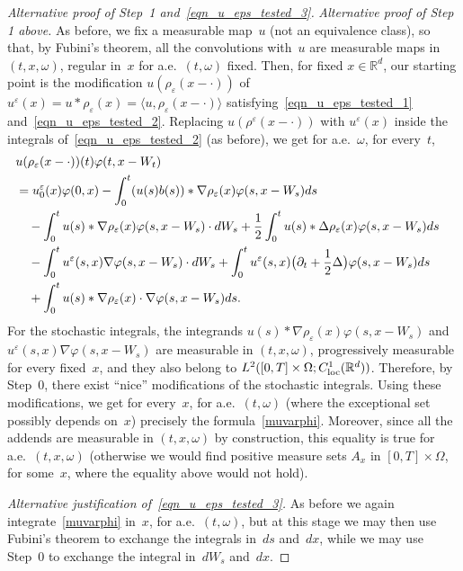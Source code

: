 \documentclass[a4paper,10pt]{article}
\newcommand\1{\mathbbm{1}}
\newcommand{\lan}{\langle}
\newcommand{\ran}{\rangle}
\newcommand{\eps}{\varepsilon}
\newcommand\loc{{\rm loc}}
\numberwithin{equation}{section}
\begin{document}
\begin{proof}[Alternative proof of Step~1 and~\eqref{eqn_u_eps_tested_3}]
\emph{Alternative proof of Step 1 above.} As before, we fix a measurable map~$u$ (not an equivalence class), so that, by Fubini's theorem, all the convolutions with~$u$ are measurable maps in $(t,x,\omega)$, regular in~$x$ for a.e.~$(t,\omega)$ fixed. Then, for fixed $x \in \mathbb{R}^d$, our starting point is the modification $u(\rho_\eps(x-\cdot))$ of $u^\eps(x) = u*\rho_\eps (x) = \lan u, \rho_\eps(x-\cdot) \ran$ satisfying~\eqref{eqn_u_eps_tested_1} and~\eqref{eqn_u_eps_tested_2}. Replacing $u(\rho^\eps(x-\cdot))$ with $u^\eps(x)$ inside the integrals of~\eqref{eqn_u_eps_tested_2} (as before), we get for a.e.~$\omega$, for every~$t$, 
\begin{align*}
\lefteqn{ u(\rho_\eps(x-\cdot))(t)\varphi(t,x-W_t)} \\
 & = u_0^\eps(x)\varphi(0,x) -\int^t_0(u(s) b(s))*\nabla\rho_\eps(x)\varphi(s,x-W_s) ds \\
 & \quad -\int^t_0 u(s)*\nabla\rho_\eps(x)\varphi(s,x-W_s)\cdot d W_s +\frac12 \int^t_0 u(s)*\Delta\rho_\eps(x)\varphi(s,x-W_s) ds \\
 & \quad -\int^t_0 u^\eps(s,x)\nabla\varphi(s,x-W_s)\cdot d W_s +\int^t_0 u^\eps(s,x) \big(\partial_t+\frac12\Delta\big)\varphi(s,x-W_s) ds \\
 & \quad +\int^t_0 u(s)*\nabla\rho_\eps(x)\cdot\nabla\varphi(s,x-W_s) ds.\end{align*}
For the stochastic integrals, the integrands $u(s)*\nabla\rho_\eps(x)\varphi(s,x-W_s)$ and $u^\eps(s,x)\nabla\varphi(s,x-W_s)$ are measurable in $(t,x,\omega)$, progressively measurable for every fixed~$x$, and they also belong to $L^2([0,T]\times\Omega;C^1_{\loc}(\mathbb{R}^d))$. Therefore, by Step~0, there exist ``nice'' modifications of the stochastic integrals. Using these modifications, we get for every~$x$, for a.e.~$(t,\omega)$ (where the exceptional set possibly depends on~$x$) precisely the formula~\eqref{muvarphi}. Moreover, since all the addends are measurable in $(t,x,\omega)$ by construction, this equality is true for a.e.~$(t,x,\omega)$ (otherwise we would find positive measure sets $A_x$ in $[0,T]\times\Omega$, for some~$x$, where the equality above would not hold).

\emph{Alternative justification of~\eqref{eqn_u_eps_tested_3}.} As before we again integrate~\eqref{muvarphi} in~$x$, for a.e.~$(t,\omega)$, but at this stage we may then use Fubini's theorem to exchange the integrals in~$ds$ and~$dx$, while we may use Step~0 to exchange the integral in~$dW_s$ and~$dx$.
\end{proof}
\end{document}
